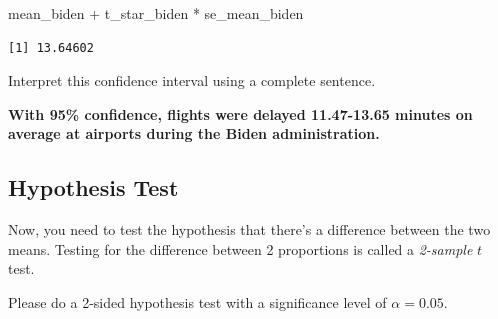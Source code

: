 \documentclass[
  letterpaper,
  DIV=11,
  numbers=noendperiod]{scrartcl}
\newenvironment{Shaded}{\begin{snugshade}}{\end{snugshade}}
\newcommand{\NormalTok}[1]{\textcolor[rgb]{0.00,0.23,0.31}{#1}}
\newcommand{\SpecialCharTok}[1]{\textcolor[rgb]{0.37,0.37,0.37}{#1}}
\begin{document}
\begin{Shaded}
\begin{Highlighting}[]
\NormalTok{mean\_biden }\SpecialCharTok{+}\NormalTok{ t\_star\_biden }\SpecialCharTok{*}\NormalTok{ se\_mean\_biden}
\end{Highlighting}
\end{Shaded}

\begin{verbatim}
[1] 13.64602
\end{verbatim}

Interpret this confidence interval using a complete sentence.

\begin{tcolorbox}[enhanced jigsaw, colback=white, breakable, arc=.35mm, left=2mm, colframe=quarto-callout-warning-color-frame, opacityback=0, rightrule=.15mm, toprule=.15mm, bottomrule=.15mm, leftrule=.75mm]

\textbf{With 95\% confidence, flights were delayed 11.47-13.65 minutes
on average at airports during the Biden administration.}

\end{tcolorbox}

\subsection{Hypothesis Test}\label{hypothesis-test-1}

Now, you need to test the hypothesis that there's a difference between
the two means. Testing for the difference between 2 proportions is
called a \emph{2-sample} \(t\) test.

Please do a 2-sided hypothesis test with a significance level of
\(\alpha=0.05\).
\end{document}
